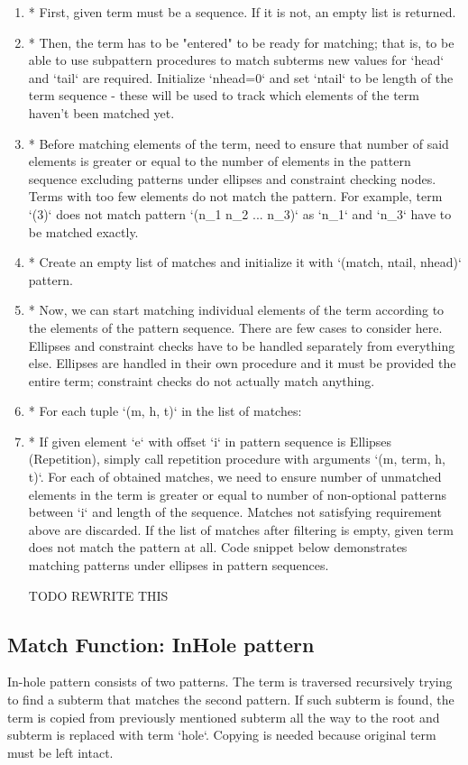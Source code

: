 \begin{enumerate}
\item
* First, given term must be a sequence. If it is not, an empty list is returned.
\item
* Then, the term has to be "entered" to be ready for matching; that is, to be able to use subpattern procedures to match subterms new values for `head` and `tail` are required. Initialize `nhead=0` and set `ntail` to be length of the term sequence - these will be used to track which elements of the term haven't been matched yet.
\item
* Before matching elements of the term, need to ensure that number of said elements is greater or equal to the number of elements in the pattern sequence excluding patterns under ellipses and constraint checking nodes. Terms with too few elements do not match the pattern. For example, term `(3)` does not match pattern `(n\_1 n\_2 ... n\_3)` as `n\_1` and `n\_3` have to be matched exactly.
\item
* Create an empty list of matches and initialize it with `(match, ntail, nhead)` pattern.
\item
* Now, we can start matching individual elements of the term according to the elements of the pattern sequence. There are few cases to consider here. Ellipses and constraint checks have to be handled separately from everything else.  Ellipses are handled in their own procedure and it must be provided the entire term; constraint checks do not actually match anything.
\item
* For each tuple `(m, h, t)` in the list of matches:
\item
* If given element `e` with offset `i` in pattern sequence is Ellipses (Repetition), simply call repetition procedure with arguments `(m, term, h, t)`. For each of obtained matches, we need to ensure number of unmatched elements in the term is greater or equal to number of non-optional patterns between `i` and length of the sequence. Matches not satisfying requirement above are discarded. If the list of matches after filtering is empty, given term does not match the pattern at all. Code snippet below demonstrates matching patterns under ellipses in pattern sequences.

TODO REWRITE THIS 
\end{enumerate}

\subsection{Match Function: InHole pattern}
In-hole pattern consists of two patterns. The term is traversed recursively trying to find a subterm that matches the second pattern. If such subterm is found, the term is copied from previously mentioned subterm all the way to the root and subterm is replaced with term `hole`. Copying is needed because original term must be left intact.

